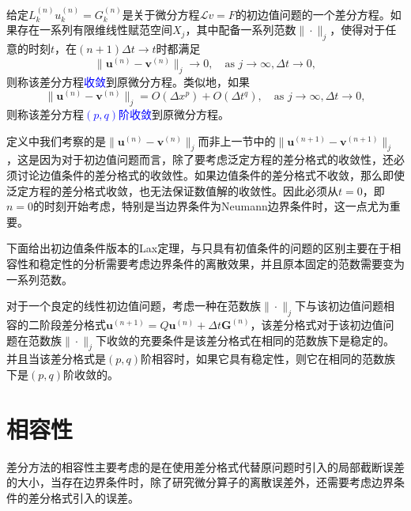 \documentclass[a4paper,10pt]{ctexart}
\begin{document}
\begin{definition}
    给定$ L_k^{(n)}u^{(n)}_k = G^{(n)}_k $是关于微分方程$ \mathcal{L}v=F $的初边值问题的一个差分方程。如果存在一系列有限维线性赋范空间$ X_j $，其中配备一系列范数$ \| \cdot \|_j $，使得对于任意的时刻$ t $，在$ (n+1)\Delta t\to t $时都满足
    \begin{equation}
        \| \bm{u}^{(n)} - \bm{v}^{(n)} \|_j \longrightarrow 0, \quad \text{as } j\to \infty,\Delta t\to 0,
    \end{equation}
    则称该差分方程\textcolor{blue}{收敛}到原微分方程。类似地，如果
    \begin{equation}
        \| \bm{u}^{(n)} - \bm{v}^{(n)} \|_j = O(\Delta x^p) + O(\Delta t^q), \quad \text{as } j\to \infty,\Delta t\to 0,
    \end{equation}
    则称该差分方程\textcolor{blue}{$ (p,q) $阶收敛}到原微分方程。
\end{definition}
\noindent 定义中我们考察的是$ \| \bm{u}^{(n)} - \bm{v}^{(n)} \|_j $而非上一节中的$ \| \bm{u}^{(n+1)} - \bm{v}^{(n+1)} \|_j $，这是因为对于初边值问题而言，除了要考虑泛定方程的差分格式的收敛性，还必须讨论边值条件的差分格式的收敛性。如果边值条件的差分格式不收敛，那么即使泛定方程的差分格式收敛，也无法保证数值解的收敛性。因此必须从$ t=0 $，即$ n=0 $的时刻开始考虑，特别是当边界条件为Neumann边界条件时，这一点尤为重要。

下面给出初边值条件版本的Lax定理，与只具有初值条件的问题的区别主要在于相容性和稳定性的分析需要考虑边界条件的离散效果，并且原本固定的范数需要变为一系列范数。
\begin{theorem}
    对于一个良定的线性初边值问题，考虑一种在范数族$ \| \cdot \|_j $下与该初边值问题相容的二阶段差分格式$ \bm{u}^{(n+1)} = Q \bm{u}^{(n)} + \Delta t \bm{G}^{(n)} $，该差分格式对于该初边值问题在范数族$ \| \cdot \|_j $下收敛的充要条件是该差分格式在相同的范数族下是稳定的。并且当该差分格式是$ (p,q) $阶相容时，如果它具有稳定性，则它在相同的范数族下是$ (p,q) $阶收敛的。
\end{theorem}

\section{相容性}
差分方法的相容性主要考虑的是在使用差分格式代替原问题时引入的局部截断误差的大小，当存在边界条件时，除了研究微分算子的离散误差外，还需要考虑边界条件的差分格式引入的误差。
\end{document}
